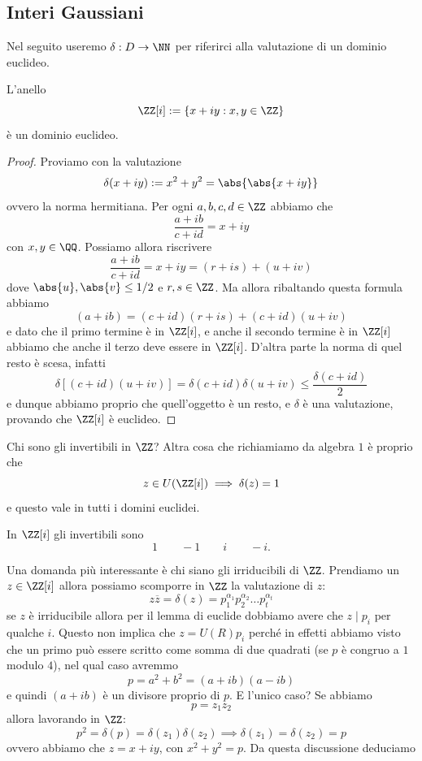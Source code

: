 \documentclass[11pt]{scrartcl}
\begin{document}
	\subsection{Interi Gaussiani}
	
	Nel seguito useremo $\delta:D\to \NN$ per riferirci alla valutazione di un dominio euclideo.
	\begin{proposition}
		L'anello 
		$$\ZZ[i]:=\left\{x+iy:x,y\in\ZZ\right\}$$
		è un dominio euclideo.
	\end{proposition} 
	\begin{proof}
		Proviamo con la valutazione
		$$\delta(x+iy):=x^2+y^2=\abs{\abs{x+iy}}$$
		ovvero la norma hermitiana. Per ogni $a,b,c,d\in\ZZ$ abbiamo che
		$$\frac{a+ib}{c+id}=x+iy$$
		con $x,y\in\QQ$. Possiamo allora riscrivere
		$$\frac{a+ib}{c+id}=x+iy=(r+is)+(u+iv)$$
		dove $\abs{u},\abs{v}\le 1/2$ e $r,s\in\ZZ$. Ma allora ribaltando questa formula abbiamo
		$$(a+ib)=(c+id)(r+is)+(c+id)(u+iv)$$
		e dato che il primo termine è in $\ZZ[i]$, e anche il secondo termine è in $\ZZ[i]$ abbiamo che anche il terzo deve essere in $\ZZ[i]$. D'altra parte la norma di quel resto è scesa, infatti
		$$\delta[(c+id)(u+iv)]=\delta(c+id)\delta(u+iv)\le \frac{\delta(c+id)}{2}$$
		e dunque abbiamo proprio che quell'oggetto è un resto, e $\delta$ è una valutazione, provando che $\ZZ[i]$ è euclideo.
	\end{proof}
	Chi sono gli invertibili in $\ZZ$? Altra cosa che richiamiamo da algebra $1$ è proprio che 
	$$z\in U(\ZZ[i]) \implies \delta(z)=1$$
	e questo vale in tutti i domini euclidei.
	\begin{example}
		In $\ZZ[i]$ gli invertibili sono 
		$$1 \qquad -1 \qquad i \qquad -i.$$
	\end{example}
	Una domanda più interessante è chi siano gli irriducibili di $\ZZ$. Prendiamo un $z\in \ZZ[i]$ allora possiamo scomporre in $\ZZ$ la valutazione di $z$:
	$$z\overline{z}=\delta(z)=p_1^{\alpha_1}p_2^{\alpha_2}\dots p_t^{\alpha_t}$$
	se $z$ è irriducibile allora per il lemma di euclide dobbiamo avere che $z\mid p_i$ per qualche $i$. Questo non implica che $z=U(R)p_i$ perché in effetti abbiamo visto che un primo può essere scritto come somma di due quadrati (se $p$ è congruo a $1$ modulo $4$), nel qual caso avremmo
	$$p=a^2+b^2=(a+ib)(a-ib)$$
	e quindi $(a+ib)$ è un divisore proprio di $p$. E l'unico caso? Se abbiamo
	$$p=z_1z_2$$
	allora lavorando in $\ZZ$:
	$$p^2=\delta(p)=\delta(z_1)\delta(z_2) \implies \delta(z_1)=\delta(z_2)=p$$
	ovvero abbiamo che $z=x+iy$, con $x^2+y^2=p$. Da questa discussione deduciamo
\end{document}
